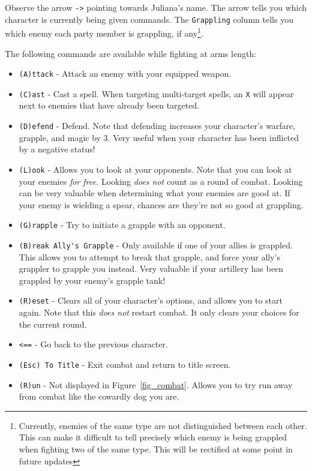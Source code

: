 \documentclass{report}
\begin{document}
Observe the arrow {\color{green!50!black} \texttt{->}} pointing towards Juliana's name. The arrow tells you which character is currently being given commands. 
The \verb|Grappling| column tells you which enemy each party member is grappling, if any\footnote{Currently, enemies of the same type are not distinguished between each
other. This
can make it difficult to tell precisely which enemy is being grappled when fighting two of the same type. This will be rectified at some point in future updates}.

The following commands are available while fighting at arms length:
\begin{itemize}
    \item \verb|(A)ttack| - Attack an enemy with your equipped weapon.
    \item \verb|(C)ast| - Cast a spell. When targeting multi-target spells, an \verb|X| will appear next to enemies that have
    already been targeted.
    \item \verb|(D)efend| - Defend. Note that defending increases your character's
    warfare, grapple, and magic by 3. Very useful when your character has been
    inflicted by a negative status!
    \item \verb|(L)ook| - Allows you to look at your opponents. Note that you can
    look at your enemies \emph{for free.} Looking \emph{does not} count as a round
    of combat. Looking can be very valuable when determining what your enemies are
    good at. If your enemy is wielding a spear, chances are they're not so good
    at grappling.
    \item \verb|(G)rapple| - Try to initiate a grapple with an opponent.
    \item \verb|(B)reak Ally's Grapple| - Only available if one of your allies is grappled.
    This allows you to attempt to break that grapple, and force your ally's grappler
    to grapple you instead. Very valuable if your artillery has been 
    grappled by your enemy's grapple tank!
    \item \verb|(R)eset| - Clears all of your character's options, and allows you
    to start again. Note that this \emph{does not} restart combat. It only 
    clears your choices for the current round.
    \item {\color{green!50!black} \texttt{<==}} - Go back to the previous 
        character.
    \item \verb|(Esc) To Title| - Exit combat and return to title screen.
    \item \verb|(R)un| - Not displayed in Figure~\ref{fig_combat}. Allows you
        to try run away from combat like the cowardly dog you are.
\end{itemize}
\end{document}
